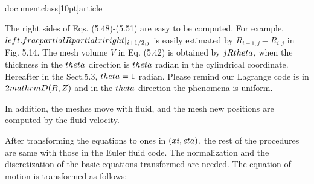 \\documentclass[10pt]{article}
\begin{document}
{The right sides of Eqs. (5.48)-(5.51) are easy to be computed. For example, $\\left.\\frac{\\partial R}{\\partial \\xi}\\right|_{i+1 / 2, j}$ is easily estimated by $R_{i+1, j}-R_{i, j}$ in Fig. 5.14. The mesh volume $V$ in Eq. (5.42) is obtained by $j R \\theta$, when the thickness in the $\\theta$ direction is $\\theta$ radian in the cylindrical coordinate. Hereafter in the Sect.5.3, $\\theta=1$ radian. Please remind our Lagrange code is in $2 \\mathrm{D}(R, Z)$ and in the $\\theta$ direction the phenomena is uniform.

In addition, the meshes move with fluid, and the mesh new positions are computed by the fluid velocity.

After transforming the equations to ones in $(\\xi, \\eta)$, the rest of the procedures are same with those in the Euler fluid code. The normalization and the discretization of the basic equations transformed are needed. The equation of motion is transformed as follows:


}
\end{document}
